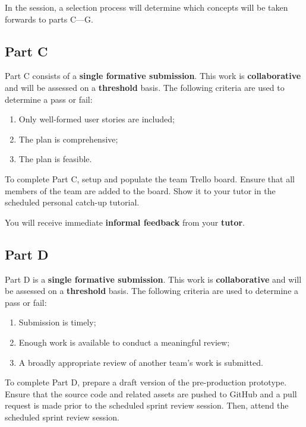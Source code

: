 \documentclass{../../fal_assignment}
\begin{document}
In the session, a selection process will determine which concepts will be taken forwards to parts C---G.

\subsection*{Part C}

Part C consists of a \textbf{single formative submission}. This work is \textbf{collaborative} and will be assessed on a \textbf{threshold} basis. The following criteria are used to determine a pass or fail:

\begin{enumerate}[label=(\alph*)]
	\item Only well-formed user stories are included;
	\item The plan is comprehensive;
	\item The plan is feasible.
\end{enumerate}

To complete Part C, setup and populate the team Trello board. Ensure that all members of the team are added to the board. Show it to your tutor in the scheduled personal catch-up tutorial.

You will receive immediate \textbf{informal feedback} from your \textbf{tutor}.

\subsection*{Part D}

Part D is a \textbf{single formative submission}. This work is \textbf{collaborative} and will be assessed on a \textbf{threshold} basis. The following criteria are used to determine a pass or fail:

\begin{enumerate}[label=(\alph*)]
	\item Submission is timely;
	\item Enough work is available to conduct a meaningful review;
	\item A broadly appropriate review of another team's work is submitted.
\end{enumerate}

To complete Part D, prepare a draft version of the pre-production prototype. Ensure that the source code and related assets are pushed to GitHub and a pull request is made prior to the scheduled sprint review session. Then, attend the scheduled sprint review session.
\end{document}
